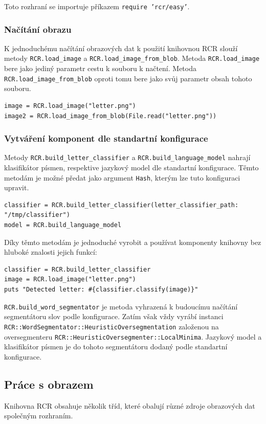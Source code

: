 \documentclass[a4paper]{article}
\begin{document}
Toto rozhraní se importuje příkazem \texttt{require 'rcr/easy'}.

\subsubsection{Načítání obrazu}
K jednoduchému načítání obrazových dat k použití knihovnou RCR slouží metody
\texttt{RCR.load\_image} a \texttt{RCR.load\_image\_from\_blob}. Metoda
\texttt{RCR.load\_image} bere jako jediný parametr cestu k souboru k načtení.
Metoda \texttt{RCR.load\_image\_from\_blob} oproti tomu bere jako svůj parametr
obsah tohoto souboru.
\begin{lstlisting}
image = RCR.load_image("letter.png")
image2 = RCR.load_image_from_blob(File.read("letter.png"))
\end{lstlisting}

\subsubsection{Vytváření komponent dle standartní konfigurace}
Metody \texttt{RCR.build\_letter\_classifier} a
\texttt{RCR.build\_language\_model} nahrají klasifikátor písmen, respektive jazykový model
dle standartní konfigurace. Těmto metodám je možné předat jako argument
\texttt{Hash}, kterým lze tuto konfiguraci upravit.
\begin{lstlisting}
classifier = RCR.build_letter_classifier(letter_classifier_path: "/tmp/classifier")
model = RCR.build_language_model
\end{lstlisting}

Díky těmto metodám je jednoduché vyrobit a používat komponenty knihovny
bez hluboké znalosti jejich funkcí:
\begin{lstlisting}
classifier = RCR.build_letter_classifier
image = RCR.load_image("letter.png")
puts "Detected letter: #{classifier.classify(image)}"
\end{lstlisting}

\texttt{RCR.build\_word\_segmentator} je metoda vyhrazená k budoucímu načítání
segmentátoru slov podle konfigurace. Zatím však vždy vyrábí instanci
\texttt{RCR::WordSegmentator::HeuristicOversegmentation} založenou na
oversegmenteru \texttt{RCR::HeuristicOversegmenter::LocalMinima}. Jazykový model
a klasifikátor písmen je do tohoto segmentátoru dodaný podle standartní
konfigurace.

\subsection{Práce s obrazem}
Knihovna RCR obsahuje několik tříd, které obalují různé zdroje obrazových dat
společným rozhraním.
\end{document}
